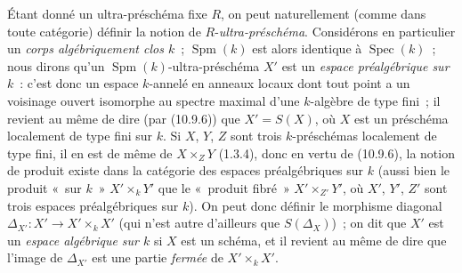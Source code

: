 \begin{env}[10.10.2]
\label{IV.10.10.2-fr}
Étant donné un ultra-préschéma fixe $R$, on peut naturellement (comme dans
toute catégorie) définir la notion de $R$-\emph{ultra-préschéma}. Considérons
en particulier un \emph{corps algébriquement clos $k$}~; $\operatorname{Spm}(k)$ est
alors identique à $\operatorname{Spec}(k)$~; nous dirons qu'un
$\operatorname{Spm}(k)$-ultra-préschéma $X'$ est un \emph{espace
préalgébrique sur $k$}~: c'est donc un espace $k$-annelé en anneaux locaux dont
tout point a un voisinage ouvert isomorphe au spectre maximal d'une $k$-algèbre
de type fini~; il revient au même de dire (par (10.9.6)) que $X'=S(X)$, où $X$
est un préschéma localement de type fini sur $k$. Si $X$, $Y$, $Z$ sont trois
$k$-préschémas localement de type fini, il en est de même de
$X\times_ZY$ (1.3.4), donc en vertu de (10.9.6), la notion de produit
existe dans la catégorie des espaces préalgébriques sur $k$ (aussi bien le
produit «~sur $k$~» $X'\times_kY'$ que le «~produit fibré~»
$X'\times_{Z'}Y'$, où $X'$, $Y'$, $Z'$ sont trois espaces préalgébriques sur
$k$). On peut donc définir le morphisme diagonal
$\Delta_{X'}:X'\to X'\times_kX'$ (qui n'est autre d'ailleurs que
$S(\Delta_X)$)~; on dit que $X'$ est un \emph{espace algébrique sur $k$} si
$X$ est un schéma, et il revient au même de dire que l'image de $\Delta_{X'}$
est une partie \emph{fermée} de $X'\times_kX'$.
\end{env}

